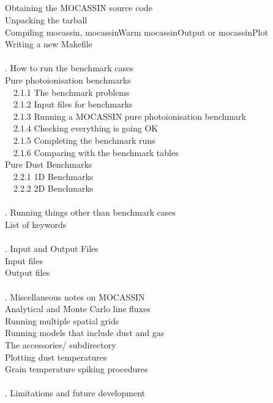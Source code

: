 \documentclass[11pt]{article}
\begin{document}
\\
\\
\\
\\
 Obtaining the MOCASSIN source code\\
 Unpacking the tarball\\
 Compiling mocassin, mocassinWarm mocassinOutput or mocassinPlot\\
 Writing a new Makefile\\
\\
. How to run the benchmark cases\\
 Pure photoionisation benchmarks\\
\indent        ~~2.1.1 The benchmark problems\\
\indent        ~~2.1.2 Input files for benchmarks\\	
\indent        ~~2.1.3 Running a MOCASSIN pure photoionisation benchmark\\
\indent        ~~2.1.4 Checking everything is going OK\\
\indent        ~~2.1.5 Completing the benchmark runs\\
\indent        ~~2.1.6 Comparing with the benchmark tables\\
 Pure Dust Benchmarks\\
\indent        ~~2.2.1 1D Benchmarks\\
\indent        ~~2.2.2 2D Benchmarks\\
\\
. Running things other than benchmark cases\\
 List of keywords\\
\\
. Input and Output Files\\
 Input files\\
 Output files\\
\\
. Miscellaneous notes on MOCASSIN\\
 Analytical and Monte Carlo line fluxes\\
 Running multiple spatial grids\\
 Running models that include dust and gas\\
 The accessories/ subdirectory\\
 Plotting dust temperatures\\
 Grain temperature spiking procedures\\
\\
. Limitations and future development\\
\end{document}
